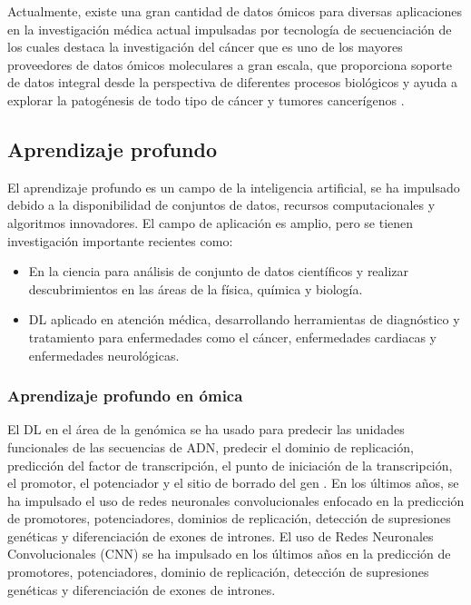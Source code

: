 Actualmente, existe una gran cantidad de datos ómicos para diversas aplicaciones en la investigación médica actual impulsadas por tecnología de secuenciación de los cuales destaca la investigación del cáncer que es uno de los mayores proveedores de datos ómicos moleculares a gran escala, que proporciona soporte de datos integral desde la perspectiva de diferentes procesos biológicos y ayuda a explorar la patogénesis de todo tipo de cáncer y tumores cancerígenos \citep{li2024avbae}.

\subsection{Aprendizaje profundo}

El aprendizaje profundo es un campo de la inteligencia artificial, se ha impulsado debido a la disponibilidad de conjuntos de datos, recursos computacionales y algoritmos innovadores. El campo de aplicación es amplio, pero se tienen investigación importante recientes como:

\begin{itemize}

   \addtolength{\itemsep}{-4mm} %
        \item En la ciencia para análisis de conjunto de datos científicos y realizar descubrimientos en las áreas de la física, química y biología.

        \item DL aplicado en atención médica, desarrollando herramientas de diagnóstico y tratamiento para enfermedades como el cáncer, enfermedades cardiacas y enfermedades neurológicas.

    \end{itemize}

\subsubsection{Aprendizaje profundo en ómica}

El DL en el área de la genómica se ha usado para predecir las unidades funcionales de las secuencias de ADN, predecir el dominio de replicación, predicción del factor de transcripción, el punto de iniciación de la transcripción, el promotor, el potenciador y el sitio de borrado del gen \citep{quang2019factornet,umarov2017recognition,zeng2016convolutional,zhang2017titer,min2017predicting,singh2019predicting,lee2015dna}. En los últimos años, se ha impulsado el uso de redes neuronales convolucionales enfocado en la predicción de promotores, potenciadores, dominios de replicación, detección de supresiones genéticas y diferenciación de exones de intrones. El uso de Redes Neuronales Convolucionales (CNN) se ha impulsado en los últimos años en la predicción de promotores, potenciadores, dominio de replicación, detección de supresiones genéticas y diferenciación de exones de intrones.

